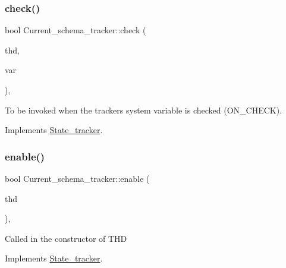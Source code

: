 \subsubsection{\texorpdfstring{check()}{check()}}
{\footnotesize\ttfamily bool Current\+\_\+schema\+\_\+tracker\+::check (\begin{DoxyParamCaption}\item[{T\+HD $\ast$}]{thd,  }\item[{\mbox{\hyperlink{classset__var}{set\+\_\+var}} $\ast$}]{var }\end{DoxyParamCaption})\hspace{0.3cm}{\ttfamily [inline]}, {\ttfamily [virtual]}}

To be invoked when the tracker\textquotesingle{}s system variable is checked (O\+N\+\_\+\+C\+H\+E\+CK). 

Implements \mbox{\hyperlink{classState__tracker_a50923266a6300e657b70dc4f0125782c}{State\+\_\+tracker}}.

\mbox{\label{classCurrent__schema__tracker_a7d1b177b9d6cd378e072aea79c07252c}} 
\subsubsection{\texorpdfstring{enable()}{enable()}}
{\footnotesize\ttfamily bool Current\+\_\+schema\+\_\+tracker\+::enable (\begin{DoxyParamCaption}\item[{T\+HD $\ast$}]{thd }\end{DoxyParamCaption})\hspace{0.3cm}{\ttfamily [inline]}, {\ttfamily [virtual]}}

Called in the constructor of T\+HD 

Implements \mbox{\hyperlink{classState__tracker_a65cd4b0d77f079f4c41620c0bf314939}{State\+\_\+tracker}}.

\mbox{\label{classCurrent__schema__tracker_a5b7b338910bed0627c6312b9de307dde}} 
